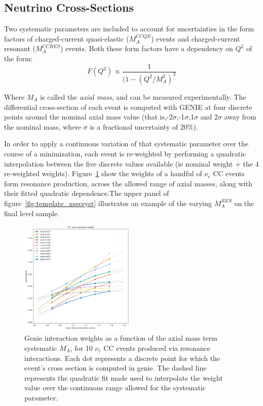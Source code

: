 \subsection{Neutrino Cross-Sections}
\label{sec:xsec_systs}
Two systematic parameters are included to account for uncertainties in the form factors of charged-current quasi-elastic ($M_{A}^{CCQE}$) events and charged-current resonant ($M_{A}^{CCRES}$) events. Both these form factors have a dependency on $Q^2$ of the form:\\

\begin{equation}
    F(Q^{2}) \propto \frac{1}{(1-(Q^{2}/M_{A}^{2})^{2}}
\end{equation}

Where $M_{A}$ is called the \textit{axial mass}, and can be measured experimentally.  The differential cross-section of each event is computed with GENIE at four discrete points around the nominal axial mass value (that is,-2$\sigma$,-1$\sigma$,1$\sigma$ and 2$\sigma$ away from the nominal mass, where $\sigma$ is a fractional uncertainty of 20\%).

In order to apply a continuous variation of that systematic parameter over the course of a minimization, each event is re-weighted by performing a quadratic interpolation between the five discrete values available (ie nominal weight + the 4 re-weighted weights). Figure~\ref{fig:resonant_mass} show the weights of a handful of $\nu_{e}$ CC events form resonance production, across the allowed range of axial masses, along with their fitted quadratic dependence.The upper panel of figure~\ref{fig:template_xsecsyst} illustrates an example of the varying $M_{A}^{RES}$ on the final level sample.

\begin{figure}
    \centering
    \includegraphics[width=0.5\textwidth]{figures/measurement/systematics/xsec/nue_cc_res_xsec_Ma_systematic.png}
    \caption{Genie interaction weights as a function of the axial mass term systematic $M_{A}$, for 10 $\nu_{e}$ CC events produced via resonance interactions. Each dot represents a discrete point for which the event's cross section is computed in genie. The dashed line represents the quadratic fit made used to interpolate the weight value over the continuous range allowed for the systematic parameter.}
    \label{fig:resonant_mass}
\end{figure}

